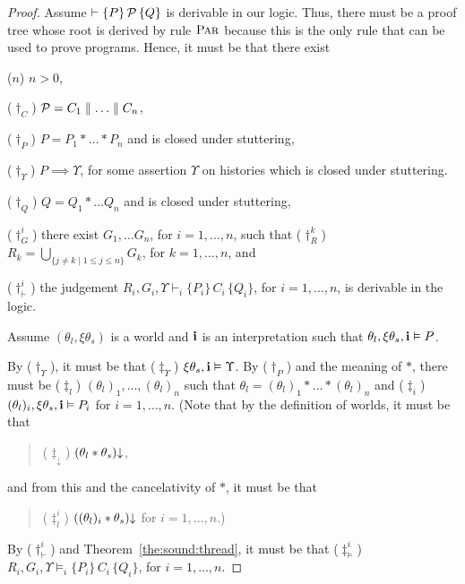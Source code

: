 \begin{proof}
Assume $\vdash \{ P \} \, \mathcal{P} \, \{ Q \}$ is derivable in our logic.
Thus, there must be a proof tree whose root is derived by rule $\textsc{Par}$
because this is the only rule that can be used to prove programs.
Hence, it must be that there exist   
\begin{compactdesc}
\item[($n$)] $n >0$,
\item[($\dag_C$)] $\mathcal{P} = C_1 \parallel \ldots \parallel C_n$, 
\item[($\dag_P$)] $P = P_1 * \ldots * P_n$ and is closed under stuttering, 
\item[($\dag_{\Upsilon}$)] $P \implies \Upsilon$, for some assertion $\Upsilon$ on
histories which is closed under stuttering.
\item[($\dag_Q$)] $Q = Q_1 * \ldots Q_n$ and is closed under stuttering, 
\item[($\dag_G^i$)] there exist  $G_1,\ldots G_n$, for $i=1,\ldots,n$,  
such that ($\dag_R^k$) $R_k = \bigcup_{\{j \neq k \mid 1 \leq j \leq n\}} G_k$, for $k=1,\ldots,n$, and
\item[($\dag_{\vdash}^i$)] the judgement   $R_i,G_i,\Upsilon  \vdash_i \{P_i\}\,C_i\,\{Q_i\}$, 
for $i = 1,\ldots, n$, is derivable in the logic. %
\end{compactdesc}

\smallskip 
Assume $(\theta_l,\xi\theta_s)$ is a world and ${\bf i}$ is an interpretation such that 
$\theta_l,\xi\theta_s,{\bf i}\vDash P$.



By ($\dag_{\Upsilon}$), it must be that ($\ddag_{\Upsilon}$) $\xi\theta_s,{\bf i}\vDash \Upsilon$.
By ($\dag_P$) and the meaning of $*$, there must be 
($\ddag_{l}$)  $(\theta_l)_1, \ldots, (\theta_l)_n$ such that $\theta_l = (\theta_l)_1 * \ldots* (\theta_l)_n$ and ($\ddag_i$) $(\theta_l)_i,\xi\theta_s,{\bf i}\vDash P_i$ for $i=1,\ldots,n$.
(Note that by the definition of worlds, it must be that 
\begin{quote}
($\ddag_{\downarrow}$) 
$(\theta_l*\theta_s)\mathpunct{\downarrow}$, 
\end{quote}
and from this 
and the cancelativity of $*$, it must be that 
\begin{quote}
($\ddag^i_{l}$) $((\theta_l)_i*\theta_s)\mathpunct{\downarrow}$ for $i=1,\ldots,n$.)
\end{quote}

By ($\dag_{\vdash}^i$) and Theorem~\ref{the:sound:thread}, it must be that
($\ddag^i_{\vDash}$) $R_i,G_i,\Upsilon \vDash_i \{P_i\}\, C_i\, \{Q_i\}$,
for $i=1,\ldots,n$.


\end{proof}
